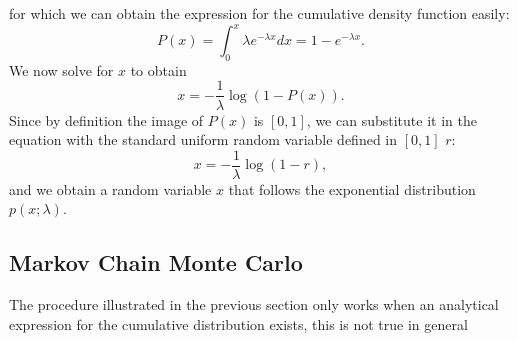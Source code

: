 for which we can obtain the expression for the cumulative density function easily:
\begin{equation}
    P(x)=\int_{0}^{x}\lambda e^{-\lambda x}dx = 1-e^{-\lambda x}.
\end{equation}
We now solve for $x$ to obtain
\begin{equation}
    x=-\frac{1}{\lambda}\log{(1-P(x))}.
\end{equation}
Since by definition the image of $P(x)$ is $[0,1]$, we can substitute it in the equation with the standard uniform random variable defined 
in $[0,1]$ $r$:
\begin{equation}
    x=-\frac{1}{\lambda}\log{(1-r)},
\end{equation}
and we obtain a random variable $x$ that follows the exponential distribution $p(x;\lambda)$.
\subsection{Markov Chain Monte Carlo}
The procedure illustrated in the previous section only works when an analytical expression for the cumulative distribution exists, 
this is not true in general
\subsection{}

